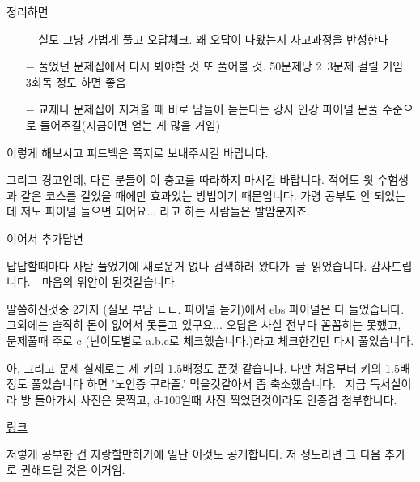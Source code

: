 정리하면
\begin{itemize}
    \item [$-$] 실모 그냥 가볍게 풀고 오답체크. 왜 오답이 나왔는지 사고과정을 반성한다
    \item [$-$] 풀었던 문제집에서 다시 봐야할 것 또 풀어볼 것. 50문제당 2~3문제 걸릴 거임. 3회독 정도 하면 좋음
    \item [$-$] 교재나 문제집이 지겨울 때 바로 남들이 듣는다는 강사 인강 파이널 문풀 수준으로 들어주길(지금이면 얻는 게 많을 거임)
\end{itemize}
\vspace{5mm}

이렇게 해보시고 피드백은 쪽지로 보내주시길 바랍니다.
\vspace{5mm}

그리고 경고인데, 다른 분들이 이 충고를 따라하지 마시길 바랍니다. 적어도 윗 수험생과 같은 코스를 걸었을 때에만 효과있는 방법이기 때문입니다.
가령 공부도 안 되었는데 저도 파이널 들으면 되어요... 라고 하는 사람들은 발암분자죠.
\vspace{5mm}

이어서 추가답변
\vspace{5mm}

답답할때마다 사탐 풀었기에 새로운거 없나 검색하러 왔다가 글 읽었습니다. 감사드립니다.  마음의 위안이 된것같습니다.
\vspace{5mm}

말씀하신것중 2가지 (실모 부담 ㄴㄴ. 파이널 듣기)에서 ebs 파이널은 다 들었습니다. 그외에는 솔직히 돈이 없어서 못듣고 있구요...
오답은 사실 전부다 꼼꼼히는 못했고, 문제풀때 주로 c (난이도별로 a.b.c로 체크했습니다.)라고 체크한건만 다시 풀었습니다.
\vspace{5mm}

아, 그리고 문제 실제로는 제 키의 1.5배정도 푼것 같습니다. 다만 처음부터 키의 1.5배정도 풀었습니다 하면 '노인증 구라즐.' 먹을것같아서 좀 축소했습니다.  지금 독서실이라 방 돌아가서 사진은 못찍고, d-100일때 사진 찍었던것이라도 인증겸 첨부합니다.
\vspace{5mm}

\href{http://dcimg2.dcinside.com/viewimage.php?id=39afd135ed80&no=29bcc427b38377a16fb3dab004c86b6f6b6cb2befefb20e3528f8026dfb46508612ef1cea9c04e95ed7932bc99f920f35041a8c1e51834bb}{링크}
\vspace{5mm}

저렇게 공부한 건 자랑할만하기에 일단 이것도 공개합니다.
저 정도라면 그 다음 추가로 권해드릴 것은 이거임.
\vspace{5mm}

